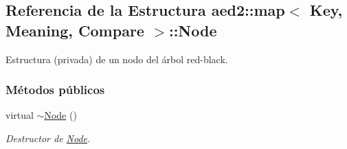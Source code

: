 \hypertarget{structaed2_1_1map_1_1Node}{}\subsection{Referencia de la Estructura aed2\+:\+:map$<$ Key, Meaning, Compare $>$\+:\+:Node}
\label{structaed2_1_1map_1_1Node}


Estructura (privada) de un nodo del árbol red-\/black.  


\subsubsection*{Métodos públicos}
\begin{DoxyCompactItemize}
\item 
virtual \hyperlink{structaed2_1_1map_1_1Node_a4f3cb2cc4302fe96432e624ced147540_a4f3cb2cc4302fe96432e624ced147540}{$\sim$\+Node} ()
\begin{DoxyCompactList}\small\item\em Destructor de \hyperlink{structaed2_1_1map_1_1Node}{Node}. \end{DoxyCompactList}\end{DoxyCompactItemize}
